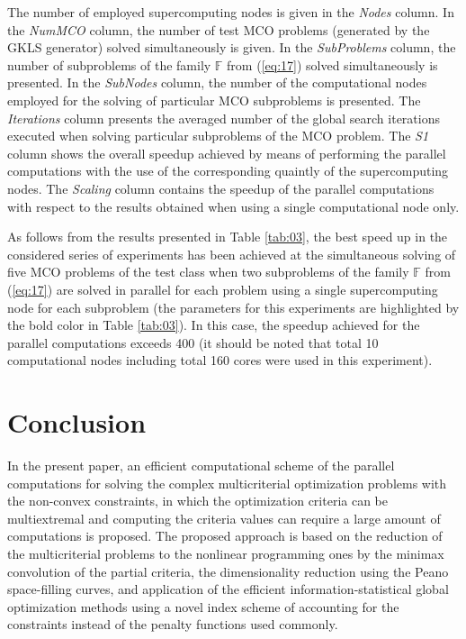\documentclass{svproc}
\begin{document}
The number of employed supercomputing nodes is given in the \textit{Nodes} column. In the \textit{NumMCO} column, the number of test MCO problems (generated by the GKLS generator) solved simultaneously is given. In the \textit{SubProblems} column, the number of subproblems of the family $\mathbb{F}$ from (\ref{eq:17}) solved simultaneously is presented. In the \textit{SubNodes} column, the number of the computational nodes employed for the solving of particular MCO subproblems is presented. The \textit{Iterations} column presents the averaged number of the global search iterations executed when solving particular subproblems of the MCO problem. The \textit{S1} column shows the overall speedup achieved by means of performing the parallel computations with the use of the corresponding quaintly of the supercomputing nodes. The \textit{Scaling} column contains the speedup of the parallel computations with respect to the results obtained when using a single computational node only.

As follows from the results presented in Table \ref{tab:03}, the best speed up in the considered series of experiments has been achieved at the simultaneous solving of five MCO problems of the test class when two subproblems of the family $\mathbb{F}$ from (\ref{eq:17}) are solved in parallel for each problem using a single supercomputing node for each subproblem (the parameters for this experiments are highlighted by the bold color in Table \ref{tab:03}). In this case, the speedup achieved for the parallel computations exceeds 400 (it should be noted that total 10 computational nodes including total 160 cores were used in this experiment).



\section{Conclusion }
\label{sec:07}


In the present paper, an efficient computational scheme of the parallel computations for solving the complex multicriterial optimization problems with the non-convex constraints, in which the optimization criteria can be multiextremal and computing the criteria values can require a large amount of computations is proposed. The proposed approach is based on the reduction of the multicriterial problems to the nonlinear programming ones by the minimax convolution of the partial criteria, the dimensionality reduction using the Peano space-filling curves, and application of the efficient information-statistical global optimization methods using a novel index scheme of accounting for the constraints instead of the penalty functions used commonly.
\end{document}
